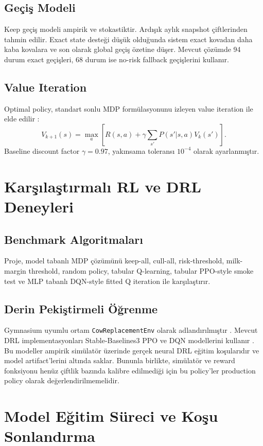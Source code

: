 \documentclass[conference]{IEEEtran}
\begin{document}
\subsection{Geçiş Modeli}
Keep geçiş modeli ampirik ve stokastiktir. Ardışık aylık snapshot çiftlerinden
tahmin edilir. Exact state desteği düşük olduğunda sistem exact kovadan daha
kaba kovalara ve son olarak global geçiş özetine düşer. Mevcut çözümde 94 durum
exact geçişleri, 68 durum ise no-risk fallback geçişlerini kullanır.

\subsection{Value Iteration}
Optimal policy, standart sonlu MDP formülasyonunu izleyen value iteration ile
elde edilir \cite{puterman1994,sutton2018}:
\begin{equation}
V_{k+1}(s) = \max_a \left[R(s,a) + \gamma
\sum_{s'}P(s'|s,a)V_k(s')\right].
\end{equation}
Baseline discount factor \(\gamma=0.97\), yakınsama toleransı \(10^{-4}\)
olarak ayarlanmıştır.

\section{Karşılaştırmalı RL ve DRL Deneyleri}
\subsection{Benchmark Algoritmaları}
Proje, model tabanlı MDP çözümünü keep-all, cull-all, risk-threshold,
milk-margin threshold, random policy, tabular Q-learning, tabular PPO-style
smoke test ve MLP tabanlı DQN-style fitted Q iteration ile karşılaştırır.

\subsection{Derin Pekiştirmeli Öğrenme}
Gymnasium uyumlu ortam \texttt{CowReplacementEnv} olarak adlandırılmıştır
\cite{gymnasium}. Mevcut DRL implementasyonları Stable-Baselines3 PPO ve DQN
modellerini kullanır \cite{mnih2015,schulman2017,stablebaselines3}. Bu modeller
ampirik simülatör üzerinde gerçek neural DRL eğitim koşularıdır ve model
artifact'lerini  altında saklar. Bununla birlikte,
simülatör ve reward fonksiyonu henüz çiftlik bazında kalibre edilmediği için
bu policy'ler production policy olarak değerlendirilmemelidir.

\section{Model Eğitim Süreci ve Koşu Sonlandırma}
\end{document}
